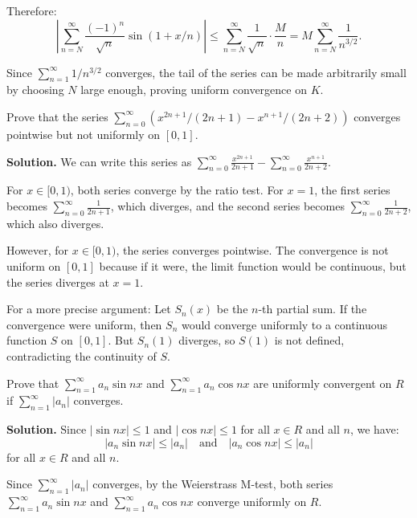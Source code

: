 Therefore:
\[\left|\sum_{n=N}^{\infty} \frac{(-1)^n}{\sqrt{n}} \sin(1 + x/n)\right| \leq \sum_{n=N}^{\infty} \frac{1}{\sqrt{n}} \cdot \frac{M}{n} = M \sum_{n=N}^{\infty} \frac{1}{n^{3/2}}.\]

Since \( \sum_{n=1}^{\infty} 1/n^{3/2} \) converges, the tail of the series can be made arbitrarily small by choosing \( N \) large enough, proving uniform convergence on \( K \).

\begin{problembox}
Prove that the series \(\sum_{n=0}^{\infty} (x^{2n+1}/(2n + 1) - x^{n+1}/(2n + 2))\) converges pointwise but not uniformly on \([0, 1]\).
\end{problembox}

\noindent\textbf{Solution.} We can write this series as \( \sum_{n=0}^{\infty} \frac{x^{2n+1}}{2n + 1} - \sum_{n=0}^{\infty} \frac{x^{n+1}}{2n + 2} \).

For \( x \in [0, 1) \), both series converge by the ratio test. For \( x = 1 \), the first series becomes \( \sum_{n=0}^{\infty} \frac{1}{2n + 1} \), which diverges, and the second series becomes \( \sum_{n=0}^{\infty} \frac{1}{2n + 2} \), which also diverges.

However, for \( x \in [0, 1) \), the series converges pointwise. The convergence is not uniform on \([0, 1]\) because if it were, the limit function would be continuous, but the series diverges at \( x = 1 \).

For a more precise argument: Let \( S_n(x) \) be the \( n \)-th partial sum. If the convergence were uniform, then \( S_n \) would converge uniformly to a continuous function \( S \) on \([0, 1]\). But \( S_n(1) \) diverges, so \( S(1) \) is not defined, contradicting the continuity of \( S \).

\begin{problembox}
Prove that \(\sum_{n=1}^{\infty} a_n \sin nx \) and \(\sum_{n=1}^{\infty} a_n \cos nx \) are uniformly convergent on \( R \) if \(\sum_{n=1}^{\infty} |a_n| \) converges.
\end{problembox}

\noindent\textbf{Solution.} Since \( |\sin nx| \leq 1 \) and \( |\cos nx| \leq 1 \) for all \( x \in R \) and all \( n \), we have:
\[|a_n \sin nx| \leq |a_n| \quad \text{and} \quad |a_n \cos nx| \leq |a_n|\]
for all \( x \in R \) and all \( n \).

Since \( \sum_{n=1}^{\infty} |a_n| \) converges, by the Weierstrass M-test, both series \( \sum_{n=1}^{\infty} a_n \sin nx \) and \( \sum_{n=1}^{\infty} a_n \cos nx \) converge uniformly on \( R \).

